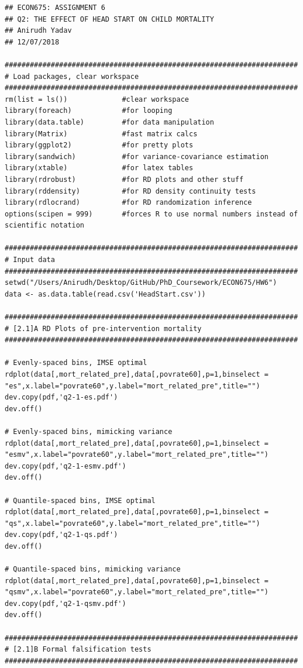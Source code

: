 \documentclass[12pt]{article}
\begin{document}
\scriptsize
\begin{verbatim}
## ECON675: ASSIGNMENT 6
## Q2: THE EFFECT OF HEAD START ON CHILD MORTALITY
## Anirudh Yadav 
## 12/07/2018

######################################################################
# Load packages, clear workspace
######################################################################
rm(list = ls())             #clear workspace
library(foreach)            #for looping
library(data.table)         #for data manipulation
library(Matrix)             #fast matrix calcs
library(ggplot2)            #for pretty plots
library(sandwich)           #for variance-covariance estimation 
library(xtable)             #for latex tables
library(rdrobust)           #for RD plots and other stuff
library(rddensity)          #for RD density continuity tests
library(rdlocrand)          #for RD randomization inference
options(scipen = 999)       #forces R to use normal numbers instead of scientific notation

######################################################################
# Input data
######################################################################
setwd("/Users/Anirudh/Desktop/GitHub/PhD_Coursework/ECON675/HW6")
data <- as.data.table(read.csv('HeadStart.csv'))

######################################################################
# [2.1]A RD Plots of pre-intervention mortality
######################################################################

# Evenly-spaced bins, IMSE optimal
rdplot(data[,mort_related_pre],data[,povrate60],p=1,binselect = "es",x.label="povrate60",y.label="mort_related_pre",title="")
dev.copy(pdf,'q2-1-es.pdf')
dev.off()

# Evenly-spaced bins, mimicking variance 
rdplot(data[,mort_related_pre],data[,povrate60],p=1,binselect = "esmv",x.label="povrate60",y.label="mort_related_pre",title="")
dev.copy(pdf,'q2-1-esmv.pdf')
dev.off()

# Quantile-spaced bins, IMSE optimal
rdplot(data[,mort_related_pre],data[,povrate60],p=1,binselect = "qs",x.label="povrate60",y.label="mort_related_pre",title="")
dev.copy(pdf,'q2-1-qs.pdf')
dev.off()

# Quantile-spaced bins, mimicking variance
rdplot(data[,mort_related_pre],data[,povrate60],p=1,binselect = "qsmv",x.label="povrate60",y.label="mort_related_pre",title="")
dev.copy(pdf,'q2-1-qsmv.pdf')
dev.off()

######################################################################
# [2.1]B Formal falsification tests
######################################################################


\end{verbatim}
\end{document}
